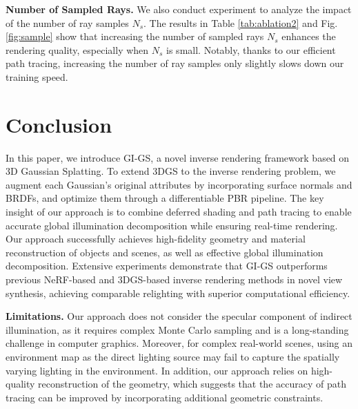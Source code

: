 \documentclass{article} %
\begin{document}
\textbf{Number of Sampled Rays.} We also conduct experiment to analyze the impact of the number of ray samples $N_s$. The results in Table \ref{tab:ablation2} and Fig. \ref{fig:sample} show that increasing the number of sampled rays $N_s$ enhances the rendering quality, especially when $N_s$ is small. Notably, thanks to our efficient path tracing, increasing the number of ray samples only slightly slows down our training speed.











\section{Conclusion}
In this paper, we introduce GI-GS, a novel inverse rendering framework based on 3D Gaussian Splatting. To extend 3DGS to the inverse rendering problem, we augment each Gaussian’s original attributes by incorporating surface normals and BRDFs, and optimize them through a differentiable PBR pipeline. The key insight of our approach is to combine deferred shading and path tracing to enable accurate global illumination decomposition while ensuring real-time rendering. Our approach successfully achieves high-fidelity geometry and material reconstruction of objects and scenes, as well as effective global illumination decomposition. Extensive experiments demonstrate that GI-GS outperforms previous NeRF-based and 3DGS-based inverse rendering methods in novel view synthesis, achieving comparable relighting with superior computational efficiency.

\textbf{Limitations.} Our approach does not consider the specular component of indirect illumination, as it requires complex Monte Carlo sampling and is a  long-standing challenge in computer graphics. Moreover, for complex real-world scenes, using an environment map as the direct lighting source may fail to capture the spatially varying lighting in the environment. In addition, our approach relies on high-quality reconstruction of the geometry, which suggests that the accuracy of path tracing can be improved by incorporating additional geometric constraints.





\clearpage
\appendix
\end{document}
